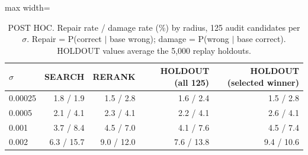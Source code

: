 \begin{table}[t]
\centering
\small
\begin{adjustbox}{max width=\linewidth}
\begin{tabular}{lrrrr}
\toprule
$\sigma$ & SEARCH & RERANK & HOLDOUT (all 125) & HOLDOUT (selected winner) \\
\midrule
0.00025 & 1.8 / 1.9 & 1.5 / 2.8 & 1.6 / 2.4 & 1.5 / 2.8 \\
0.0005 & 2.1 / 4.1 & 2.3 / 4.1 & 2.2 / 4.1 & 2.6 / 4.1 \\
0.001 & 3.7 / 8.4 & 4.5 / 7.0 & 4.1 / 7.6 & 4.5 / 7.4 \\
0.002 & 6.3 / 15.7 & 9.0 / 12.0 & 7.6 / 13.8 & 9.4 / 10.6 \\
\bottomrule
\end{tabular}
\end{adjustbox}
\caption{POST HOC. Repair rate / damage rate (\%) by radius, 125 audit candidates per $\sigma$. Repair = P(correct $\mid$ base wrong); damage = P(wrong $\mid$ base correct). HOLDOUT values average the 5,000 replay holdouts.}
\label{tab:radius-repair}
\end{table}
